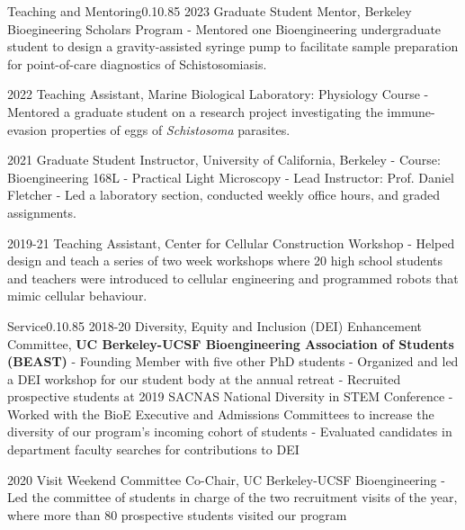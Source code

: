 \documentclass{federico_cv}
\begin{document}
\begin{tblSection}{Teaching and Mentoring}{0.1}{0.85}
\leftbfrightsingle
{2023}
{Graduate Student Mentor, Berkeley Bioegineering Scholars Program}
{- Mentored one Bioengineering undergraduate student to design a gravity-assisted syringe pump to facilitate sample preparation for point-of-care diagnostics of Schistosomiasis.}

\leftbfrightsingle
{2022}
{Teaching Assistant, Marine Biological Laboratory: Physiology Course}
{- Mentored a graduate student on a research project investigating the immune-evasion properties of eggs of \textit{Schistosoma} parasites.}


\leftbfrightsingle
{2021}
{Graduate Student Instructor, University of California, Berkeley}
{- Course: Bioengineering 168L - Practical Light Microscopy}
{- Lead Instructor: Prof. Daniel Fletcher}
{- Led a laboratory section, conducted weekly office hours, and graded assignments.}

\leftbfrightsingle
{2019-21}
{Teaching Assistant, Center for Cellular Construction Workshop}
{- Helped design and teach a series of two week workshops where 20 high school students and teachers were introduced to cellular engineering and programmed robots that mimic cellular behaviour.}

\end{tblSection}


\begin{tblSection}{Service}{0.1}{0.85}
\leftbfrightsingle
{2018-20}
{Diversity, Equity and Inclusion (DEI) Enhancement Committee,}
{\textbf{UC Berkeley-UCSF Bioengineering Association of Students (BEAST)}}
{- Founding Member with five other PhD students}
{- Organized and led a DEI workshop for our student body at the annual retreat}
{- Recruited prospective students at 2019 SACNAS National Diversity in STEM Conference}
{- Worked with the BioE Executive and Admissions Committees to increase the diversity of our program's incoming cohort of students}
{- Evaluated candidates in department faculty searches for contributions to DEI}

\leftbfrightsingle
{2020}
{Visit Weekend Committee Co-Chair, UC Berkeley-UCSF Bioengineering}
{- Led the committee of students in charge of the two recruitment visits of the year, where more than 80 prospective students visited our program}

\end{tblSection}
\end{document}
